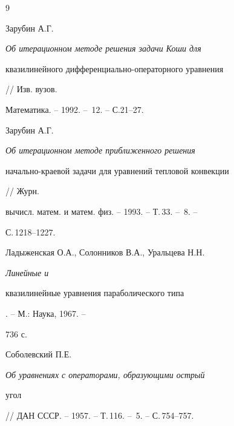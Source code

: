 \begin{thebibliography}{9}







Зарубин А.Г. {\em Об итерационном методе решения задачи Коши для


квазилинейного дифференциально-операторного уравнения} // Изв. вузов.


Математика. -- 1992. -- \No\,12. -- С.21--27.




Зарубин А.Г. {\em Об итерационном методе приближенного решения


начально-краевой задачи для уравнений тепловой конвекции} // Журн.


вычисл. матем. и матем. физ. -- 1993. -- Т.\,33. -- \No\,8. --


С.\,1218--1227.




Ладыженская О.А., Солонников В.А., Уральцева Н.Н. {\em Линейные и


квазилинейные уравнения параболического типа}. -- М.: Наука, 1967. --


736 с.




Соболевский П.Е. {\em Об уравнениях с операторами, образующими острый


угол} // ДАН СССР. -- 1957. -- Т.\,116. -- \No\,5. -- С.\,754--757.





\end{thebibliography}





\vskip 2cm


















